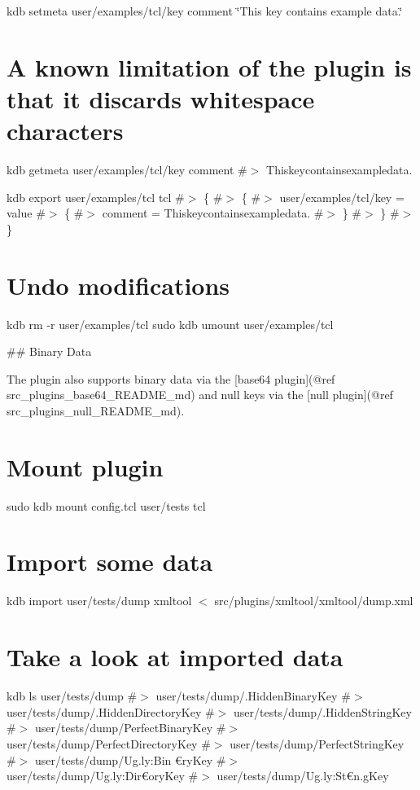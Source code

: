 kdb setmeta user/examples/tcl/key comment \char`\"{}\+This key contains example data.\char`\"{} \section*{A known limitation of the plugin is that it discards whitespace characters}

kdb getmeta user/examples/tcl/key comment \#$>$ Thiskeycontainsexampledata.

kdb export user/examples/tcl tcl \#$>$ \{ \#$>$ \{ \#$>$ user/examples/tcl/key = value \#$>$ \{ \#$>$ comment = Thiskeycontainsexampledata. \#$>$ \} \#$>$ \} \#$>$ \}

\section*{Undo modifications}

kdb rm -\/r user/examples/tcl sudo kdb umount user/examples/tcl 
\begin{DoxyCode}
## Binary Data

The plugin also supports binary data via the [base64 plugin](@ref src\_plugins\_base64\_README\_md) and null
       keys via the [null plugin](@ref src\_plugins\_null\_README\_md).
\end{DoxyCode}
 \section*{Mount plugin}

sudo kdb mount config.\+tcl user/tests tcl

\section*{Import some data}

kdb import user/tests/dump xmltool $<$ src/plugins/xmltool/xmltool/dump.\+xml

\section*{Take a look at imported data}

kdb ls user/tests/dump \#$>$ user/tests/dump/.Hidden\+Binary\+Key \#$>$ user/tests/dump/.Hidden\+Directory\+Key \#$>$ user/tests/dump/.Hidden\+String\+Key \#$>$ user/tests/dump/\+Perfect\+Binary\+Key \#$>$ user/tests/dump/\+Perfect\+Directory\+Key \#$>$ user/tests/dump/\+Perfect\+String\+Key \#$>$ user/tests/dump/\+Ug.\+ly\+:Bin{\itshape } €ry\+Key \#$>$ user/tests/dump/\+Ug.\+ly\+:Dir€ory\+Key \#$>$ user/tests/dump/\+Ug.\+ly\+:St€n.\+g\+Key

